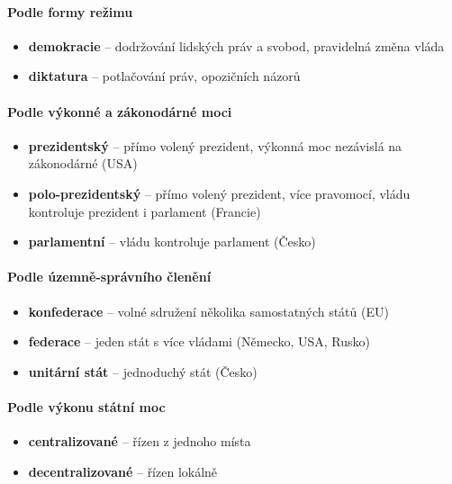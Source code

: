 \paragraph{Podle formy režimu}
\begin{itemize}
\item \textbf{demokracie} -- dodržování lidských práv a svobod, pravidelná změna vláda
\item \textbf{diktatura} -- potlačování práv, opozičních názorů
\end{itemize}

\paragraph{Podle výkonné a zákonodárné moci}
\begin{itemize}
\item \textbf{prezidentský} -- přímo volený prezident, výkonná moc nezávislá na zákonodárné (USA)
\item \textbf{polo-prezidentský} -- přímo volený prezident, více pravomocí, vládu kontroluje prezident i parlament (Francie)
\item \textbf{parlamentní} -- vládu kontroluje parlament (Česko)
\end{itemize}

\paragraph{Podle územně-správního členění}
\begin{itemize}
\item \textbf{konfederace} -- volné sdružení několika samostatných států (EU)
\item \textbf{federace}  -- jeden stát s více vládami (Německo, USA, Rusko)
\item \textbf{unitární stát} -- jednoduchý stát (Česko)
\end{itemize}

\paragraph{Podle výkonu státní moc}
\begin{itemize}
\item \textbf{centralizované} -- řízen z jednoho místa
\item \textbf{decentralizované} -- řízen lokálně
\end{itemize}
